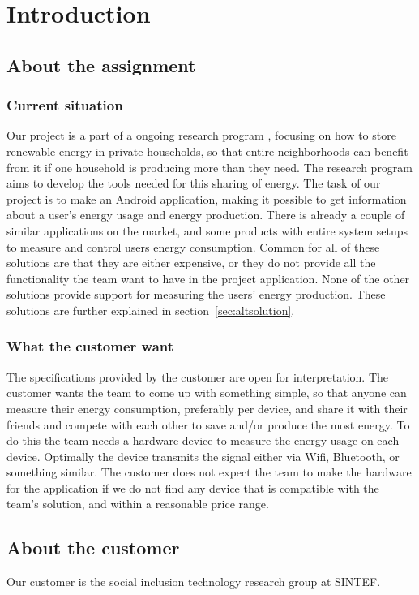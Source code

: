\chapter{Introduction}

\section{About the assignment}
\subsection{Current situation}
Our project is a part of a ongoing research program \cite{cossmic}, focusing on how to store renewable energy in private households, so that entire neighborhoods can benefit from it if one household is producing more than they need. The research program aims to develop the tools needed for this sharing of energy. The task of our project is to make an Android application, making it possible to get information about a user's energy usage and energy production. There is already a couple of similar applications on the market, and some products with entire system setups to measure and control users energy consumption. Common for all of these solutions are that they are either expensive, or they do not provide all the functionality the team want to have in the project application. None of the other solutions provide support for measuring the users' energy production. These solutions are further explained in section~\ref{sec:altsolution}.

\subsection{What the customer want}
The specifications provided by the customer are open for interpretation. The customer wants the team to come up with something simple, so that anyone can measure their energy consumption, preferably per device, and share it with their friends and compete with each other to save and/or produce the most energy. To do this the team needs a hardware device to measure the energy usage on each device. Optimally the device transmits the signal either via Wifi, Bluetooth, or something similar. The customer does not expect the team to make the hardware for the application if we do not find any device that is compatible with the team's solution, and within a reasonable price range.

\section{About the customer}

Our customer is the social inclusion technology research group at SINTEF. \cite{sintef}








 


